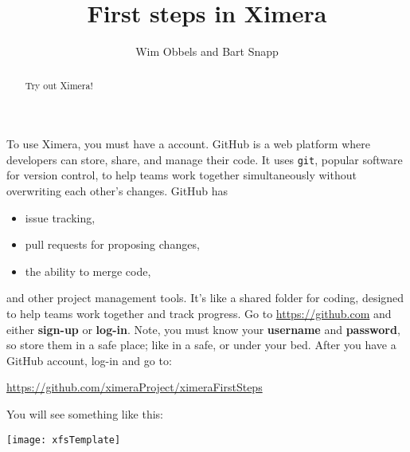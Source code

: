 \documentclass{ximera}
\author{Wim Obbels and Bart Snapp}
\title{First steps in Ximera}
\begin{document}
        \begin{abstract}
            Try out Ximera!
        \end{abstract}
        \maketitle

        To use Ximera, you must have a 
        account. GitHub is a web platform where developers can store, share,
        and manage
        their code. It uses \verb!git!, popular software for version control,
        to help
        teams work together simultaneously without overwriting each other's
        changes.
        GitHub has
        \begin{itemize}
            \item issue tracking,
            \item pull requests for proposing changes,
            \item the ability to merge code,
        \end{itemize}
        and other project management tools. It's like a shared folder for
        coding, designed to
        help teams work together and track progress. Go to
        \url{https://github.com} and
        either \textbf{sign-up} or \textbf{log-in}. Note, you must know your \textbf{username}
        and
        \textbf{password}, so store them in a safe place; like in a safe, or
        under your
        bed. After you have a GitHub account, log-in and go to:
        \begin{center}
            \url{https://github.com/ximeraProject/ximeraFirstSteps}
        \end{center}
        You will see something like this:
        \pdfOnly{\end{multicols}}\enlargethispage{1.5em}
\begin{image}
    \texttt{[image: xfsTemplate]}
\end{image}
\newpage
\end{document}
